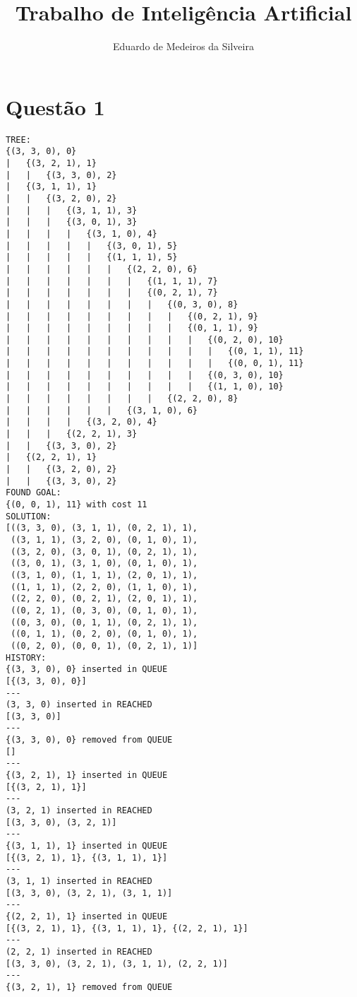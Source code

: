 \documentclass{article}
\title{Trabalho de Inteligência Artificial}
\author{Eduardo de Medeiros da Silveira}
\date{}
\begin{document}
\maketitle

\section{Questão 1}

\begin{verbatim}
TREE:
{(3, 3, 0), 0}
|   {(3, 2, 1), 1}
|   |   {(3, 3, 0), 2}
|   {(3, 1, 1), 1}
|   |   {(3, 2, 0), 2}
|   |   |   {(3, 1, 1), 3}
|   |   |   {(3, 0, 1), 3}
|   |   |   |   {(3, 1, 0), 4}
|   |   |   |   |   {(3, 0, 1), 5}
|   |   |   |   |   {(1, 1, 1), 5}
|   |   |   |   |   |   {(2, 2, 0), 6}
|   |   |   |   |   |   |   {(1, 1, 1), 7}
|   |   |   |   |   |   |   {(0, 2, 1), 7}
|   |   |   |   |   |   |   |   {(0, 3, 0), 8}
|   |   |   |   |   |   |   |   |   {(0, 2, 1), 9}
|   |   |   |   |   |   |   |   |   {(0, 1, 1), 9}
|   |   |   |   |   |   |   |   |   |   {(0, 2, 0), 10}
|   |   |   |   |   |   |   |   |   |   |   {(0, 1, 1), 11}
|   |   |   |   |   |   |   |   |   |   |   {(0, 0, 1), 11}
|   |   |   |   |   |   |   |   |   |   {(0, 3, 0), 10}
|   |   |   |   |   |   |   |   |   |   {(1, 1, 0), 10}
|   |   |   |   |   |   |   |   {(2, 2, 0), 8}
|   |   |   |   |   |   {(3, 1, 0), 6}
|   |   |   |   {(3, 2, 0), 4}
|   |   |   {(2, 2, 1), 3}
|   |   {(3, 3, 0), 2}
|   {(2, 2, 1), 1}
|   |   {(3, 2, 0), 2}
|   |   {(3, 3, 0), 2}
FOUND GOAL:
{(0, 0, 1), 11} with cost 11
SOLUTION:
[((3, 3, 0), (3, 1, 1), (0, 2, 1), 1),
 ((3, 1, 1), (3, 2, 0), (0, 1, 0), 1),
 ((3, 2, 0), (3, 0, 1), (0, 2, 1), 1),
 ((3, 0, 1), (3, 1, 0), (0, 1, 0), 1),
 ((3, 1, 0), (1, 1, 1), (2, 0, 1), 1),
 ((1, 1, 1), (2, 2, 0), (1, 1, 0), 1),
 ((2, 2, 0), (0, 2, 1), (2, 0, 1), 1),
 ((0, 2, 1), (0, 3, 0), (0, 1, 0), 1),
 ((0, 3, 0), (0, 1, 1), (0, 2, 1), 1),
 ((0, 1, 1), (0, 2, 0), (0, 1, 0), 1),
 ((0, 2, 0), (0, 0, 1), (0, 2, 1), 1)]
HISTORY:
{(3, 3, 0), 0} inserted in QUEUE
[{(3, 3, 0), 0}]
---
(3, 3, 0) inserted in REACHED
[(3, 3, 0)]
---
{(3, 3, 0), 0} removed from QUEUE
[]
---
{(3, 2, 1), 1} inserted in QUEUE
[{(3, 2, 1), 1}]
---
(3, 2, 1) inserted in REACHED
[(3, 3, 0), (3, 2, 1)]
---
{(3, 1, 1), 1} inserted in QUEUE
[{(3, 2, 1), 1}, {(3, 1, 1), 1}]
---
(3, 1, 1) inserted in REACHED
[(3, 3, 0), (3, 2, 1), (3, 1, 1)]
---
{(2, 2, 1), 1} inserted in QUEUE
[{(3, 2, 1), 1}, {(3, 1, 1), 1}, {(2, 2, 1), 1}]
---
(2, 2, 1) inserted in REACHED
[(3, 3, 0), (3, 2, 1), (3, 1, 1), (2, 2, 1)]
---
{(3, 2, 1), 1} removed from QUEUE

\end{verbatim}
\end{document}
